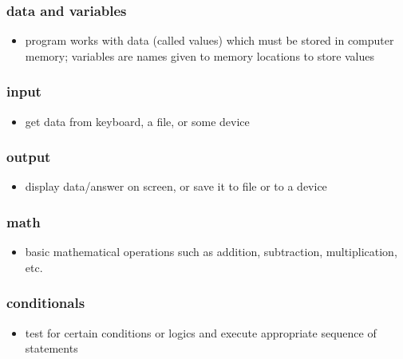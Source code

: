 \documentclass[11pt]{article}
\providecommand{\tightlist}{%
      \setlength{\itemsep}{0pt}\setlength{\parskip}{0pt}}
\begin{document}
\hypertarget{data-and-variables}{%
\subsubsection{data and variables}\label{data-and-variables}}

\begin{itemize}
\tightlist
\item
  program works with data (called values) which must be stored in
  computer memory; variables are names given to memory locations to
  store values
\end{itemize}

\hypertarget{input}{%
\subsubsection{input}\label{input}}

\begin{itemize}
\tightlist
\item
  get data from keyboard, a file, or some device
\end{itemize}

\hypertarget{output}{%
\subsubsection{output}\label{output}}

\begin{itemize}
\tightlist
\item
  display data/answer on screen, or save it to file or to a device
\end{itemize}

\hypertarget{math}{%
\subsubsection{math}\label{math}}

\begin{itemize}
\tightlist
\item
  basic mathematical operations such as addition, subtraction,
  multiplication, etc.
\end{itemize}

\hypertarget{conditionals}{%
\subsubsection{conditionals}\label{conditionals}}

\begin{itemize}
\tightlist
\item
  test for certain conditions or logics and execute appropriate sequence
  of statements
\end{itemize}
\end{document}
